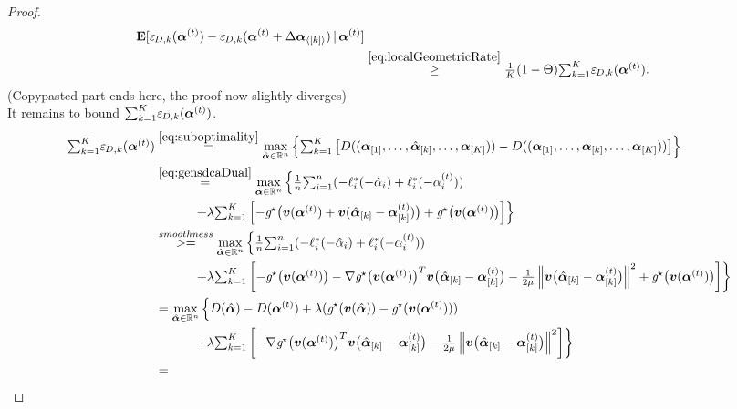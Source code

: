 \begin{proof}
\begin{align*}
 \operatorname*{\mathbf{E}}[
  {\varepsilon}_{\hspace{-0.08em}D,k}(\bm{\alpha}^{(t)})
 - {\varepsilon}_{\hspace{-0.08em}D,k}(\bm{\alpha}^{(t)}+   \Delta\bm{\alpha}_{\langle[k]\rangle} )
 \,|\, \bm{\alpha}^{(t)} ]
\\
&\overset{\eqref{eq:localGeometricRate}}{\geq}
 \tfrac1K  (1-\Theta)
 \textstyle{\sum}_{k=1}^K
  {\varepsilon}_{\hspace{-0.08em}D,k}(\bm{\alpha}^{(t)}) .
\end{align*}
(Copypasted part ends here, the proof now slightly diverges)\\
It remains to bound
$\textstyle{\sum}_{k=1}^K {\varepsilon}_{\hspace{-0.08em}D,k}(\bm{\alpha}^{(t)})$.
\begin{align*}
\textstyle{\sum}_{k=1}^K
  \suboptlocal(\av^{(t)})
&\overset{\eqref{eq:suboptimality}}{=}%
 \max_{ \hat \av \in \R^{n}}
 \left\{ \textstyle{\sum}_{k=1}^K
\left[D((\av_{[1]},\dots,\hat \av_{[k]},\dots,
\av_{[K]}))
- D((\av_{[1]},\dots,\av_{[k]},\dots,
\av_{[K]}))
\right] \right\}
\\
&\overset{\eqref{eq:gensdcaDual}}{=} %
 \max_{ \hat \av \in \R^{n}}
 \left\{
  \tfrac1n \textstyle{\sum}_{i=1}^n
 (-  \ell_i^*(-\hat \alpha_i)
+ \ell_i^*(- \alpha^{(t)}_i)  )
 \right. \\ &\quad\quad\quad \left.
 +
\lambda  \textstyle{\sum}_{k=1}^K
\left[
 -  \dualreg\big( \vv(\av^{(t)}) + \vv (\hat \av_{[k]} - \av^{(t)}_{[k]}) \big)
+  \dualreg\big( \vv(\av^{(t)}) \big)
\right] \right\}
\\
&\overset{smoothness}{>=} %
 \max_{ \hat \av \in \R^{n}}
 \left\{
  \tfrac1n \textstyle{\sum}_{i=1}^n
 (-  \ell_i^*(-\hat \alpha_i)
+ \ell_i^*(- \alpha^{(t)}_i)  )
 \right. \\ &\quad\quad\quad \left.
 +
\lambda  \textstyle{\sum}_{k=1}^K
\left[
 - \dualreg\big(\vv(\av^{(t)})\big) -\nabla\dualreg\big(\vv(\av^{(t)})\big)^T \vv\big(\hat\av_{[k]} -\av_{[k]}^{(t)}\big)
 - \frac{1}{2\mu}\norm{\vv\big(\hat\av_{[k]}-\av_{[k]}^{(t)}\big)}^2 + \dualreg\big(\vv(\av^{(t)})\big)
\right] \right\}
\\
&= %
\max_{ \hat \av \in \R^{n}}
 \left\{
  D(\hat \av)
  -D(\av^{(t)})
 +\lambda(\dualreg(\vv(\hat\av)) - \dualreg(\vv(\av^{(t)})))
  \right. \\ &\quad\quad\quad \left.
 +
\lambda  \textstyle{\sum}_{k=1}^K
\left[
 -\nabla\dualreg\big(\vv(\av^{(t)})\big)^T \vv\big(\hat\av_{[k]} -\av_{[k]}^{(t)}\big)
 - \frac{1}{2\mu}\norm{\vv\big(\hat\av_{[k]}-\av_{[k]}^{(t)}\big)}^2
\right] \right\}
\\
&= %

\end{align*}
\end{proof}
